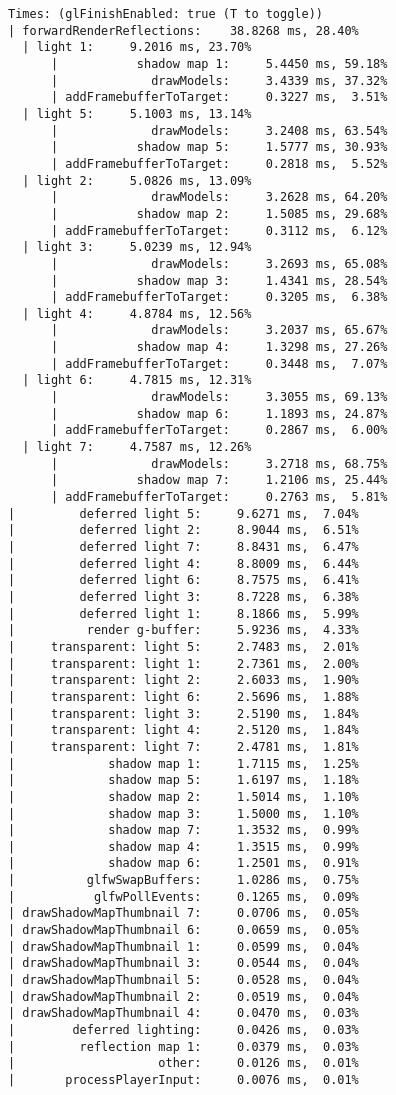 \begin{verbatim}
Times: (glFinishEnabled: true (T to toggle))
| forwardRenderReflections:    38.8268 ms, 28.40%
  | light 1:     9.2016 ms, 23.70%
      |           shadow map 1:     5.4450 ms, 59.18%
      |             drawModels:     3.4339 ms, 37.32%
      | addFramebufferToTarget:     0.3227 ms,  3.51%
  | light 5:     5.1003 ms, 13.14%
      |             drawModels:     3.2408 ms, 63.54%
      |           shadow map 5:     1.5777 ms, 30.93%
      | addFramebufferToTarget:     0.2818 ms,  5.52%
  | light 2:     5.0826 ms, 13.09%
      |             drawModels:     3.2628 ms, 64.20%
      |           shadow map 2:     1.5085 ms, 29.68%
      | addFramebufferToTarget:     0.3112 ms,  6.12%
  | light 3:     5.0239 ms, 12.94%
      |             drawModels:     3.2693 ms, 65.08%
      |           shadow map 3:     1.4341 ms, 28.54%
      | addFramebufferToTarget:     0.3205 ms,  6.38%
  | light 4:     4.8784 ms, 12.56%
      |             drawModels:     3.2037 ms, 65.67%
      |           shadow map 4:     1.3298 ms, 27.26%
      | addFramebufferToTarget:     0.3448 ms,  7.07%
  | light 6:     4.7815 ms, 12.31%
      |             drawModels:     3.3055 ms, 69.13%
      |           shadow map 6:     1.1893 ms, 24.87%
      | addFramebufferToTarget:     0.2867 ms,  6.00%
  | light 7:     4.7587 ms, 12.26%
      |             drawModels:     3.2718 ms, 68.75%
      |           shadow map 7:     1.2106 ms, 25.44%
      | addFramebufferToTarget:     0.2763 ms,  5.81%
|         deferred light 5:     9.6271 ms,  7.04%
|         deferred light 2:     8.9044 ms,  6.51%
|         deferred light 7:     8.8431 ms,  6.47%
|         deferred light 4:     8.8009 ms,  6.44%
|         deferred light 6:     8.7575 ms,  6.41%
|         deferred light 3:     8.7228 ms,  6.38%
|         deferred light 1:     8.1866 ms,  5.99%
|          render g-buffer:     5.9236 ms,  4.33%
|     transparent: light 5:     2.7483 ms,  2.01%
|     transparent: light 1:     2.7361 ms,  2.00%
|     transparent: light 2:     2.6033 ms,  1.90%
|     transparent: light 6:     2.5696 ms,  1.88%
|     transparent: light 3:     2.5190 ms,  1.84%
|     transparent: light 4:     2.5120 ms,  1.84%
|     transparent: light 7:     2.4781 ms,  1.81%
|             shadow map 1:     1.7115 ms,  1.25%
|             shadow map 5:     1.6197 ms,  1.18%
|             shadow map 2:     1.5014 ms,  1.10%
|             shadow map 3:     1.5000 ms,  1.10%
|             shadow map 7:     1.3532 ms,  0.99%
|             shadow map 4:     1.3515 ms,  0.99%
|             shadow map 6:     1.2501 ms,  0.91%
|          glfwSwapBuffers:     1.0286 ms,  0.75%
|           glfwPollEvents:     0.1265 ms,  0.09%
| drawShadowMapThumbnail 7:     0.0706 ms,  0.05%
| drawShadowMapThumbnail 6:     0.0659 ms,  0.05%
| drawShadowMapThumbnail 1:     0.0599 ms,  0.04%
| drawShadowMapThumbnail 3:     0.0544 ms,  0.04%
| drawShadowMapThumbnail 5:     0.0528 ms,  0.04%
| drawShadowMapThumbnail 2:     0.0519 ms,  0.04%
| drawShadowMapThumbnail 4:     0.0470 ms,  0.03%
|        deferred lighting:     0.0426 ms,  0.03%
|         reflection map 1:     0.0379 ms,  0.03%
|                    other:     0.0126 ms,  0.01%
|       processPlayerInput:     0.0076 ms,  0.01%
\end{verbatim}
